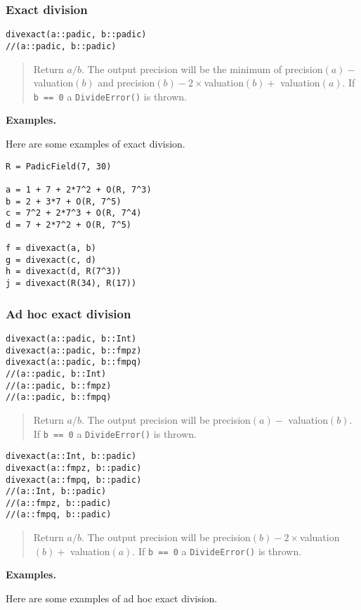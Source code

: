 \documentclass[a4paper,10pt]{article}
\newcommand{\code}{\lstinline}
\newcommand{\desc}[1]{\vspace{-3mm}\begin{quote}#1\end{quote}}
\begin{document}
{{\subsubsection{Exact division}

\begin{lstlisting}
divexact(a::padic, b::padic)
//(a::padic, b::padic)
\end{lstlisting}

\desc{Return $a/b$. The output precision will be the minimum of 
precision$(a) -$ valuation$(b)$ and precision$(b) - 2\times$valuation$(b) +$
valuation$(a)$. If \code{b == 0} a \code{DivideError()} is thrown.}

\textbf{Examples.}

Here are some examples of exact division.

\begin{lstlisting}
R = PadicField(7, 30)

a = 1 + 7 + 2*7^2 + O(R, 7^3)
b = 2 + 3*7 + O(R, 7^5)
c = 7^2 + 2*7^3 + O(R, 7^4)
d = 7 + 2*7^2 + O(R, 7^5)

f = divexact(a, b)
g = divexact(c, d)
h = divexact(d, R(7^3))
j = divexact(R(34), R(17))
\end{lstlisting}


\subsubsection{Ad hoc exact division}

\begin{lstlisting}
divexact(a::padic, b::Int)
divexact(a::padic, b::fmpz)
divexact(a::padic, b::fmpq)
//(a::padic, b::Int)
//(a::padic, b::fmpz)
//(a::padic, b::fmpq)
\end{lstlisting}

\desc{Return $a/b$. The output precision will be precision$(a) -$ 
valuation$(b)$. If \code{b == 0} a \code{DivideError()} is thrown.}

\begin{lstlisting}
divexact(a::Int, b::padic)
divexact(a::fmpz, b::padic)
divexact(a::fmpq, b::padic)
//(a::Int, b::padic)
//(a::fmpz, b::padic)
//(a::fmpq, b::padic)
\end{lstlisting}

\desc{Return $a/b$. The output precision will be 
precision$(b) - 2\times$valuation$(b) +$ valuation$(a)$. If \code{b == 0}
a \code{DivideError()} is thrown.}

\textbf{Examples.}

Here are some examples of ad hoc exact division.

}}
\end{document}
